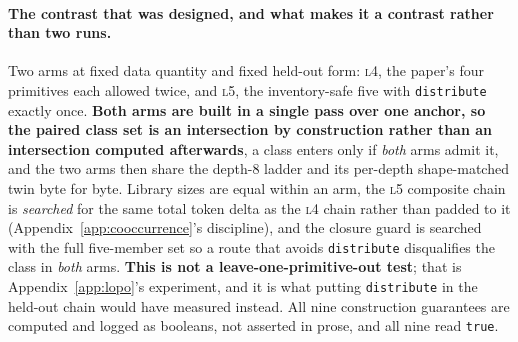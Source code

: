 \paragraph{The contrast that was designed, and what makes it a contrast rather than two runs.} Two arms at fixed data quantity and fixed held-out form: \textsc{l4}, the paper's four primitives each allowed twice, and \textsc{l5}, the inventory-safe five with \texttt{distribute} exactly once. \textbf{Both arms are built in a single pass over one anchor, so the paired class set is an intersection by construction rather than an intersection computed afterwards}, a class enters only if \emph{both} arms admit it, and the two arms then share the depth-$8$ ladder and its per-depth shape-matched twin byte for byte. Library sizes are equal within an arm, the \textsc{l5} composite chain is \emph{searched} for the same total token delta as the \textsc{l4} chain rather than padded to it (Appendix~\ref{app:cooccurrence}'s discipline), and the closure guard is searched with the full five-member set so a route that avoids \texttt{distribute} disqualifies the class in \emph{both} arms. \textbf{This is not a leave-one-primitive-out test}; that is Appendix~\ref{app:lopo}'s experiment, and it is what putting \texttt{distribute} in the held-out chain would have measured instead. All nine construction guarantees are computed and logged as booleans, not asserted in prose, and all nine read \texttt{true}.

